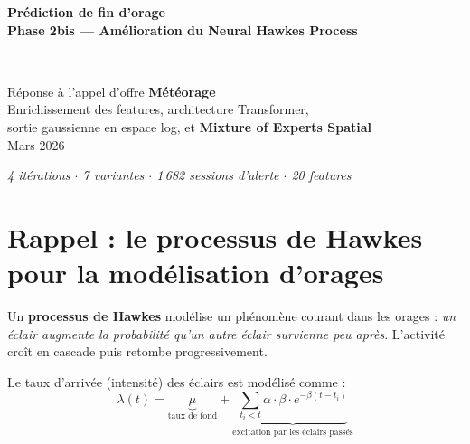 \documentclass[11pt,a4paper]{article}
\newenvironment{keybox}[1]
  {\begin{tcolorbox}[colback=meteoGray,colframe=meteoBlue,title={\textbf{#1}},
    fonttitle=\small, boxrule=0.6pt, arc=3pt]}
  {\end{tcolorbox}}
\begin{document}
\begin{titlepage}
  \pagecolor{meteoBlue}
  \color{white}
  \vspace*{2cm}
  \begin{center}
    {\Huge\bfseries Prédiction de fin d'orage\\[0.4em]}
    {\large\bfseries Phase 2bis — Amélioration du Neural Hawkes Process}\\[2em]
    \rule{0.5\linewidth}{0.8pt}\\[1.5em]
    {\large Réponse à l'appel d'offre \textbf{Météorage}}\\[0.5em]
    {\normalsize Enrichissement des features, architecture Transformer,\\
    sortie gaussienne en espace log, et \textbf{Mixture of Experts Spatial}}\\[3em]
    {\normalsize Mars 2026}
  \end{center}
  \vfill
  \begin{center}
    \small\textit{4 itérations $\cdot$ 7 variantes $\cdot$ 1\,682 sessions d'alerte $\cdot$ 20 features}
  \end{center}
\end{titlepage}
\nopagecolor

\tableofcontents
\newpage

\section{Rappel : le processus de Hawkes pour la modélisation d'orages}

\begin{keybox}{Intuition}
Un \textbf{processus de Hawkes} modélise un phénomène courant dans les orages : \emph{un éclair augmente la probabilité qu'un autre éclair survienne peu après}. L'activité croît en cascade puis retombe progressivement.
\end{keybox}

Le taux d'arrivée (intensité) des éclairs est modélisé comme :
\begin{equation}
\lambda(t) = \underbrace{\mu}_{\text{taux de fond}} + \underbrace{\sum_{t_i < t} \alpha \cdot \beta \cdot e^{-\beta (t - t_i)}}_{\text{excitation par les éclairs passés}}
\end{equation}
\end{document}
